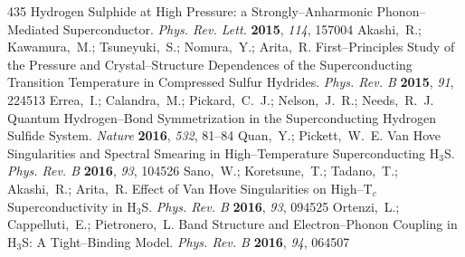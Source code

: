 \documentclass[12pt,letterpaper,oneside]{article}
\begin{document}
\begin{mcitethebibliography}{435}
    Hydrogen Sulphide at High Pressure: a Strongly--Anharmonic
  Phonon--Mediated Superconductor. \emph{Phys. Rev. Lett.} \textbf{2015},
  \emph{114}, 157004\relax
\mciteBstWouldAddEndPuncttrue
\mciteSetBstMidEndSepPunct{\mcitedefaultmidpunct}
{\mcitedefaultendpunct}{\mcitedefaultseppunct}\relax
\EndOfBibitem
{}
Akashi,~R.; Kawamura,~M.; Tsuneyuki,~S.; Nomura,~Y.; Arita,~R.
  First--Principles Study of the Pressure and Crystal--Structure Dependences of
  the Superconducting Transition Temperature in Compressed Sulfur Hydrides.
  \emph{Phys. Rev. B} \textbf{2015}, \emph{91}, 224513\relax
\mciteBstWouldAddEndPuncttrue
\mciteSetBstMidEndSepPunct{\mcitedefaultmidpunct}
{\mcitedefaultendpunct}{\mcitedefaultseppunct}\relax
\EndOfBibitem
{}
Errea,~I.; Calandra,~M.; Pickard,~C.~J.; Nelson,~J.~R.; Needs,~R.~J.
    Quantum Hydrogen--Bond Symmetrization in the Superconducting
  Hydrogen Sulfide System. \emph{Nature} \textbf{2016}, \emph{532},
  81--84\relax
\mciteBstWouldAddEndPuncttrue
\mciteSetBstMidEndSepPunct{\mcitedefaultmidpunct}
{\mcitedefaultendpunct}{\mcitedefaultseppunct}\relax
\EndOfBibitem
{}
Quan,~Y.; Pickett,~W.~E. Van Hove Singularities and Spectral Smearing in
  High--Temperature Superconducting H$_3$S. \emph{Phys. Rev. B} \textbf{2016},
  \emph{93}, 104526\relax
\mciteBstWouldAddEndPuncttrue
\mciteSetBstMidEndSepPunct{\mcitedefaultmidpunct}
{\mcitedefaultendpunct}{\mcitedefaultseppunct}\relax
\EndOfBibitem
{}
Sano,~W.; Koretsune,~T.; Tadano,~T.; Akashi,~R.; Arita,~R. Effect of Van Hove
  Singularities on High--T$_c$ Superconductivity in H$_3$S. \emph{Phys. Rev. B}
  \textbf{2016}, \emph{93}, 094525\relax
\mciteBstWouldAddEndPuncttrue
\mciteSetBstMidEndSepPunct{\mcitedefaultmidpunct}
{\mcitedefaultendpunct}{\mcitedefaultseppunct}\relax
\EndOfBibitem
{}
Ortenzi,~L.; Cappelluti,~E.; Pietronero,~L. Band Structure and Electron--Phonon
  Coupling in H$_3$S: A Tight--Binding Model. \emph{Phys. Rev. B}
  \textbf{2016}, \emph{94}, 064507\relax
\mciteBstWouldAddEndPuncttrue
\mciteSetBstMidEndSepPunct{\mcitedefaultmidpunct}
{\mcitedefaultendpunct}{\mcitedefaultseppunct}\relax
\EndOfBibitem

\end{mcitethebibliography}
\end{document}

